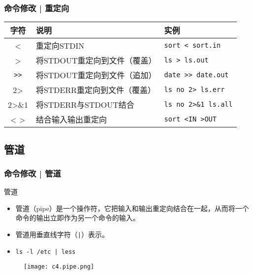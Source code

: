 \begin{frame}[fragile]
  \frametitle{命令修改 | \alert{重定向}}
  \begin{table}
    \centering
    \begin{tabular}{cll}
      \hline
      \rowcolor{blue!50}字符 & 说明 & 实例\\
      \hline
      < & 重定向STDIN & \verb|sort < sort.in|\\
      > & 将STDOUT重定向到文件（覆盖） & \verb|ls > ls.out|\\
      \verb|>>| & 将STDOUT重定向到文件（追加） & \verb|date >> date.out|\\
      2> & 将STDERR重定向到文件（覆盖） & \verb|ls no 2> ls.err|\\
      2>\&1 & 将STDERR与STDOUT结合 & \verb|ls no 2>&1 ls.all|\\
      < > & 结合输入输出重定向 & \verb|sort <IN >OUT|\\
      \hline
    \end{tabular}
  \end{table}
\end{frame}

\subsection{管道}
\begin{frame}[fragile]
  \frametitle{命令修改 | \alert{管道}}
  \begin{block}{管道}
    \begin{itemize}
      \item 管道（pipe）是一个操作符，它把输入和输出重定向结合在一起，从而将一个命令的输出立即作为另一个命令的输入。
      \item 管道用垂直线字符（\verb=|=）表示。
      \item \verb=ls -l /etc | less=
    \end{itemize}
  \end{block}
  \begin{figure}
    \centering
    \texttt{[image: c4.pipe.png]}
  \end{figure}
\end{frame}

